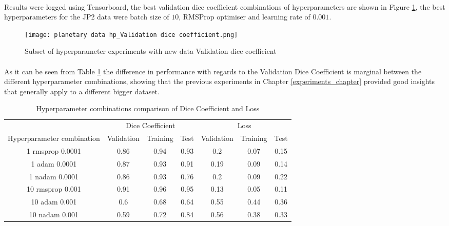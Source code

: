 \paragraph{}
Results were logged using Tensorboard, the best validation dice coefficient combinations of hyperparameters are shown in Figure \ref{hp}, the best hyperparameters for the \gls{JP2} data were batch size of $10$, \gls{RMSProp} optimiser and learning rate of $0.001$.

\begin{figure}[hbt!]
    \centering
    \texttt{[image: planetary data hp\_Validation dice coefficient.png]}
    \caption{Subset of hyperparameter experiments with new data Validation dice coefficient}
    \label{hp}
\end{figure}
\paragraph{}
As it can be seen from Table \ref{tab_hp} the difference in performance with regards to the Validation Dice Coefficient is marginal between the different hyperparameter combinations, showing that the previous experiments in Chapter \ref{experiments_chapter} provided good insights that generally apply to a different bigger dataset.

\begin{table}[ht!] 
    \begin{center}
    \begin{tabular}{ccccccc} 
    \toprule
       & \multicolumn{3}{c}{Dice Coefficient}     & \multicolumn{3}{c}{Loss} \\
    Hyperparameter combination & Validation & Training & Test & Validation    & Training    & Test   \\ \midrule
    1 rmsprop 0.0001 & 0.86 & 0.94 & 0.93 & 0.2 & 0.07 & 0.15  \\ 1 adam 0.0001 & 0.87 & 0.93 & 0.91 & 0.19 & 0.09 & 0.14  \\ 1 nadam 0.0001 & 0.86 & 0.93 & 0.76 & 0.2 & 0.09 & 0.22  \\ \rowcolor{lightgray}10 rmsprop 0.001 & 0.91 & 0.96 & 0.95 & 0.13 & 0.05 & 0.11  \\ 10 adam 0.001 & 0.6 & 0.68 & 0.64 & 0.55 & 0.44 & 0.36  \\ 10 nadam 0.001 & 0.59 & 0.72 & 0.84 & 0.56 & 0.38 & 0.33  \\
\bottomrule
    \end{tabular}
  \end{center} 
  \caption{Hyperparameter combinations comparison of Dice Coefficient and Loss}\label{tab_hp}
\end{table}
